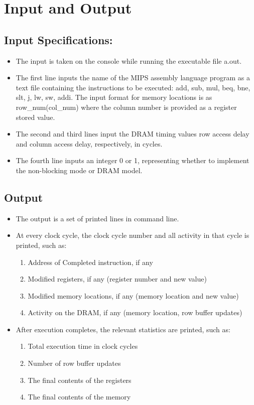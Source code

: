 \documentclass{article} %
\begin{document}
\section{Input and Output}
\subsection{Input Specifications:}
\begin{itemize}
    \item The input is taken on the console while running the executable file a.out.
    \item The first line inputs the name of the MIPS assembly language program as a text file containing the instructions to be executed: add, sub, mul, beq, bne, slt, j, lw, sw, addi. The input format for memory locations is as row\_num(col\_num) where the column number is provided as a register stored value.
    \item The second and third lines input the DRAM timing values row access delay and column access delay, respectively, in cycles.
    \item The fourth line inputs an integer 0 or 1, representing whether to implement the non-blocking mode or DRAM model.
\end{itemize}
\subsection{Output}
\begin{itemize}
    \item The output is a set of printed lines in command line.
    \item At every clock cycle, the clock cycle number and all activity in that cycle is printed, such as:
    \begin{enumerate}
        \item Address of Completed instruction, if any
        \item Modified registers, if any (register number and new value)
        \item Modified memory locations, if any (memory location and new value)
        \item Activity on the DRAM, if any (memory location, row buffer updates)
    \end{enumerate}
    \item After execution completes, the relevant statistics are printed, such as:
    \begin{enumerate}
        \item Total execution time in clock cycles
        \item Number of row buffer updates
        \item The final contents of the registers
        \item The final contents of the memory
    \end{enumerate}
\end{itemize}
\end{document}
